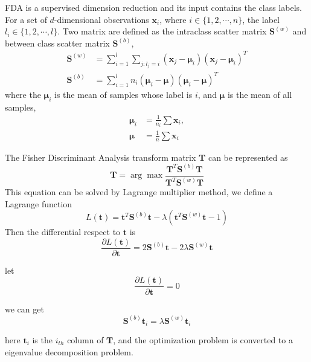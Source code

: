 FDA is a supervised dimension reduction and its input contains the class labels. For a set of $d$-dimensional observations $\bm{x}_i$, where $i\in\{1,2,\cdots,n\}$, the label $l_i\in\{1,2,\cdots,l\}$. Two matrix are defined as the intraclass scatter matrix $\bm{S}^{(w)}$ and between class scatter matrix
$\bm{S}^{(b)}$, 
\begin{equation}
\begin{aligned}
\bm{S}^{(w)} &= \mathop{\sum} _{i=1}^l\mathop{\sum}_{j:l_j = i} (\bm{x}_j - \bm{\mu}_i)(\bm{x}_j - \bm{\mu}_i)^T \\
\bm{S}^{(b)}  &= \mathop{\sum} _{i=1}^l n_i(\bm{\mu}_i - \bm{\mu})(\bm{\mu}_i - \bm{\mu})^T
\end{aligned}
\end{equation}
where the $\bm{\mu}_i$ is the mean of samples whose label is $i$, and $\bm{\mu}$ is the mean of all samples,
\begin{equation}
\begin{aligned}
\bm{\mu}_i &= \frac{1}{n_i} \sum \bm{x}_i, \\
\bm{\mu} &= \frac{1}{n} \sum \bm{x}_i
\end{aligned}
\end{equation}

The Fisher Discriminant Analysis transform matrix $\bm{T}$ can be represented as 
\begin{equation}
\bm{T} = \arg\max \frac{\bm{T}^T\bm{S}^{(b)}\bm{T}}{\bm{T}^T\bm{S}^{(w)}\bm{T}}
\end{equation}
This equation can be solved by Lagrange multiplier method, we define a Lagrange function 
\begin{equation}
L(\bm{t}) = \bm{t}^T\bm{S}^{(b)}\bm{t} - \lambda(\bm{t}^T\bm{S}^{(w)}\bm{t} - 1)
\end{equation}
Then the differential respect to $\bm{t}$ is 
\begin{equation}
\frac{\partial L(\bm{t})}{\partial \bm{t}} = 2\bm{S}^{(b)}\bm{t} - 2\lambda \bm{S}^{(w)}\bm{t}
\end{equation}

let 
\begin{equation}
\frac{\partial L(\bm{t})}{\partial \bm{t}} = 0
\end{equation}

we can get 
\begin{equation}\label{eigen1}
\bm{S}^{(b)}\bm{t}_i  = \lambda \bm{S}^{(w)}\bm{t}_i
\end{equation}


here $\bm{t}_i$ is the $i_{th}$ column of $\bm{T}$, and the optimization problem is converted to a eigenvalue decomposition problem. 

